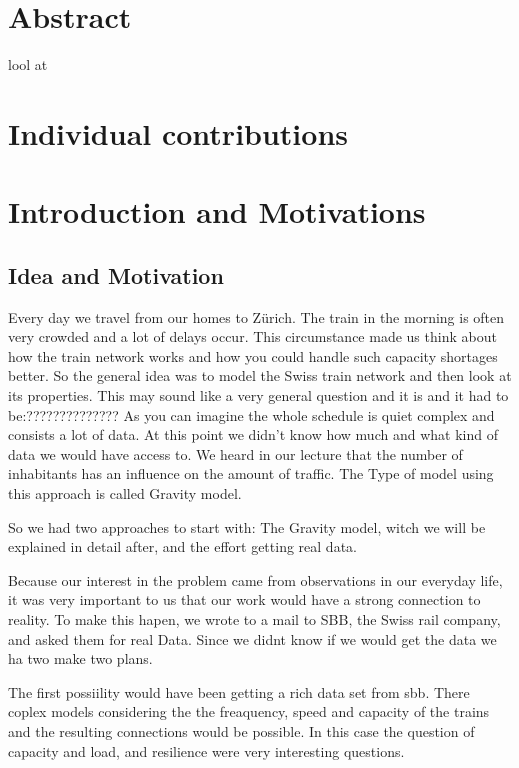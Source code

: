 \documentclass[11pt]{article}
\begin{document}
\section{Abstract}

lool at

\section{Individual contributions}

\section{Introduction and Motivations}

\subsection{Idea and Motivation}


Every day we travel from our homes to Zürich. The train in the morning is often very crowded and a lot of delays occur. This circumstance made us think about how the train network works and how you could handle such capacity shortages better. 
So the general idea was to model the Swiss train network and then look at its properties. This may sound like a very general question and it is and it had to be:?????????????? As you can imagine the whole schedule is quiet complex and consists a lot of data. At this point we didn't know how much and what kind of data we would have access to. We heard in our lecture that the number of inhabitants has an influence on the amount of traffic. The Type of model using this approach is called Gravity model.

So we had two approaches to start with: The Gravity model, witch we will be explained in detail after, and the effort getting real data.

Because our interest in the problem came from observations in our everyday life, it was very important to us that our work would have a strong connection to reality. To make this hapen, we wrote to a mail to SBB, the Swiss rail company, and asked them for real Data. Since we didnt know if we would get the data we ha two make two plans.

The first possiility would have been getting a rich data set from sbb. There coplex models considering the the freaquency, speed and capacity of the trains and the resulting connections would be possible. In this case the question of capacity and load, and resilience were very interesting questions.
\end{document}
